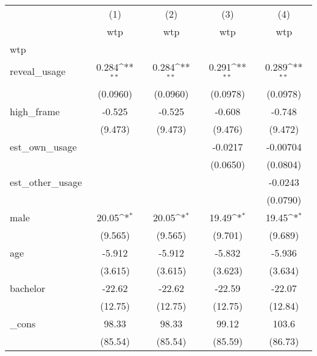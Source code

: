 {
\def\sym#1{\ifmmode^{#1}\else\(^{#1}\)\fi}
\begin{tabular}{l*{4}{c}}
\hline\hline
          &\multicolumn{1}{c}{(1)}&\multicolumn{1}{c}{(2)}&\multicolumn{1}{c}{(3)}&\multicolumn{1}{c}{(4)}\\
          &\multicolumn{1}{c}{wtp}&\multicolumn{1}{c}{wtp}&\multicolumn{1}{c}{wtp}&\multicolumn{1}{c}{wtp}\\
\hline
wtp       &                  &                  &                  &                  \\
reveal\_usage&    0.284\sym{**} &    0.284\sym{**} &    0.291\sym{**} &    0.289\sym{**} \\
          & (0.0960)         & (0.0960)         & (0.0978)         & (0.0978)         \\
[1em]
high\_frame&   -0.525         &   -0.525         &   -0.608         &   -0.748         \\
          &  (9.473)         &  (9.473)         &  (9.476)         &  (9.472)         \\
[1em]
est\_own\_usage&                  &                  &  -0.0217         & -0.00704         \\
          &                  &                  & (0.0650)         & (0.0804)         \\
[1em]
est\_other\_usage&                  &                  &                  &  -0.0243         \\
          &                  &                  &                  & (0.0790)         \\
[1em]
male      &    20.05\sym{*}  &    20.05\sym{*}  &    19.49\sym{*}  &    19.45\sym{*}  \\
          &  (9.565)         &  (9.565)         &  (9.701)         &  (9.689)         \\
[1em]
age       &   -5.912         &   -5.912         &   -5.832         &   -5.936         \\
          &  (3.615)         &  (3.615)         &  (3.623)         &  (3.634)         \\
[1em]
bachelor  &   -22.62         &   -22.62         &   -22.59         &   -22.07         \\
          &  (12.75)         &  (12.75)         &  (12.75)         &  (12.84)         \\
[1em]
\_cons    &    98.33         &    98.33         &    99.12         &    103.6         \\
          &  (85.54)         &  (85.54)         &  (85.59)         &  (86.73)         \\

\end{tabular}}
